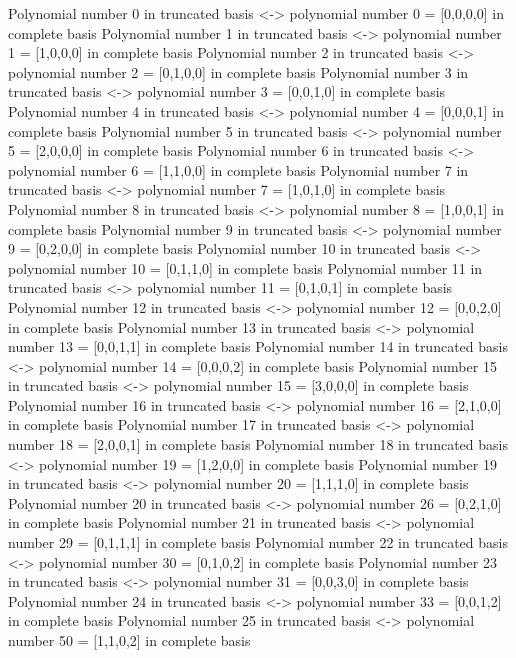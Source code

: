 Polynomial number  0  in truncated basis <-> polynomial number  0  =  [0,0,0,0]  in complete basis
Polynomial number  1  in truncated basis <-> polynomial number  1  =  [1,0,0,0]  in complete basis
Polynomial number  2  in truncated basis <-> polynomial number  2  =  [0,1,0,0]  in complete basis
Polynomial number  3  in truncated basis <-> polynomial number  3  =  [0,0,1,0]  in complete basis
Polynomial number  4  in truncated basis <-> polynomial number  4  =  [0,0,0,1]  in complete basis
Polynomial number  5  in truncated basis <-> polynomial number  5  =  [2,0,0,0]  in complete basis
Polynomial number  6  in truncated basis <-> polynomial number  6  =  [1,1,0,0]  in complete basis
Polynomial number  7  in truncated basis <-> polynomial number  7  =  [1,0,1,0]  in complete basis
Polynomial number  8  in truncated basis <-> polynomial number  8  =  [1,0,0,1]  in complete basis
Polynomial number  9  in truncated basis <-> polynomial number  9  =  [0,2,0,0]  in complete basis
Polynomial number  10  in truncated basis <-> polynomial number  10  =  [0,1,1,0]  in complete basis
Polynomial number  11  in truncated basis <-> polynomial number  11  =  [0,1,0,1]  in complete basis
Polynomial number  12  in truncated basis <-> polynomial number  12  =  [0,0,2,0]  in complete basis
Polynomial number  13  in truncated basis <-> polynomial number  13  =  [0,0,1,1]  in complete basis
Polynomial number  14  in truncated basis <-> polynomial number  14  =  [0,0,0,2]  in complete basis
Polynomial number  15  in truncated basis <-> polynomial number  15  =  [3,0,0,0]  in complete basis
Polynomial number  16  in truncated basis <-> polynomial number  16  =  [2,1,0,0]  in complete basis
Polynomial number  17  in truncated basis <-> polynomial number  18  =  [2,0,0,1]  in complete basis
Polynomial number  18  in truncated basis <-> polynomial number  19  =  [1,2,0,0]  in complete basis
Polynomial number  19  in truncated basis <-> polynomial number  20  =  [1,1,1,0]  in complete basis
Polynomial number  20  in truncated basis <-> polynomial number  26  =  [0,2,1,0]  in complete basis
Polynomial number  21  in truncated basis <-> polynomial number  29  =  [0,1,1,1]  in complete basis
Polynomial number  22  in truncated basis <-> polynomial number  30  =  [0,1,0,2]  in complete basis
Polynomial number  23  in truncated basis <-> polynomial number  31  =  [0,0,3,0]  in complete basis
Polynomial number  24  in truncated basis <-> polynomial number  33  =  [0,0,1,2]  in complete basis
Polynomial number  25  in truncated basis <-> polynomial number  50  =  [1,1,0,2]  in complete basis
